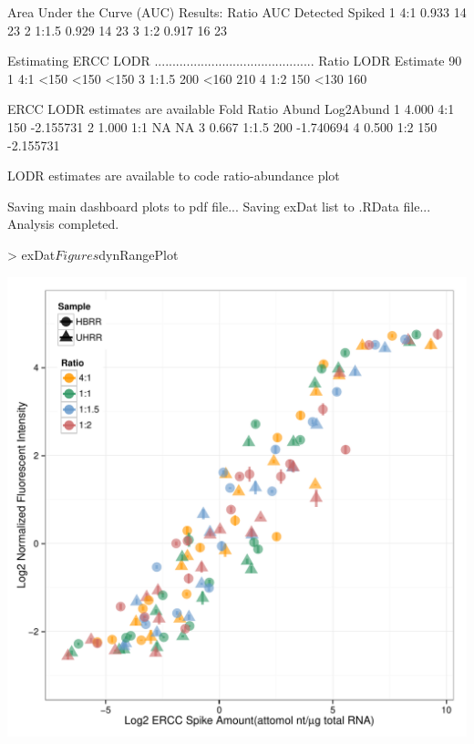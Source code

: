 \documentclass{article}
\begin{document}
\begin{Schunk}
\begin{Soutput}
Area Under the Curve (AUC) Results:
  Ratio   AUC Detected Spiked
1   4:1 0.933       14     23
2 1:1.5 0.929       14     23
3   1:2 0.917       16     23

Estimating ERCC LODR
.............................................
  Ratio LODR Estimate 90%
1   4:1          <150               <150               <150
3 1:1.5           200               <160                210
4   1:2           150               <130                160

 ERCC LODR estimates are available
   Fold Ratio Abund Log2Abund
1 4.000   4:1   150 -2.155731
2 1.000   1:1    NA        NA
3 0.667 1:1.5   200 -1.740694
4 0.500   1:2   150 -2.155731

LODR estimates are available to code ratio-abundance plot

Saving main dashboard plots to pdf file...
Saving exDat list to .RData file...
Analysis completed.
\end{Soutput}
\end{Schunk}
\clearpage
\begin{center}
\begin{Schunk}
\begin{Sinput}
> exDat$Figures$dynRangePlot
\end{Sinput}
\end{Schunk}
\includegraphics{erccdashboardVignette-seqcArrayPlotA}
\end{center}
\end{document}
